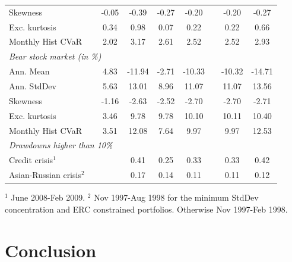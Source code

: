\documentclass[12pt,a4paper]{article}
\begin{document}
\begin{table}[tb]
\begin{center}
{\begin{tabular}{|lc c  cccc c cc| }
  \multicolumn{2}{|l}{Skewness }       &      &  -0.05 & -0.39 & -0.27 & -0.20 && -0.20 & -0.27   \\
    \multicolumn{2}{|l}{Exc. kurtosis }   &     & 0.34 & 0.98 & 0.07 & 0.22 & &0.22 & 0.66 \\
 \multicolumn{2}{|l}{Monthly Hist  CVaR}   &    &  2.02 & 3.17 & 2.61 & 2.52 & & 2.52 & 2.93 \\ \hline
 \multicolumn{10}{|l|}{\emph{Bear stock market (in \%)}} \\
 \multicolumn{2}{|l}{Ann. Mean  }    &       & 4.83 & -11.94 & -2.71 & -10.33 & & -10.32 & -14.71 \\
 \multicolumn{2}{|l}{Ann. StdDev}     &       & 5.63 & 13.01 & 8.96 & 11.07 & & 11.07 & 13.56       \\
  \multicolumn{2}{|l}{Skewness}     &         & -1.16 & -2.63 & -2.52 & -2.70 & & -2.70 & -2.71 \\
    \multicolumn{2}{|l}{Exc. kurtosis}   &     &3.46 & 9.78 & 9.78 & 10.10 & & 10.11 & 10.40     \\
 \multicolumn{2}{|l}{Monthly Hist  CVaR}   &	 & 3.51 & 12.08 & 7.64 & 9.97 & & 9.97 & 12.53 \\ \hline
\multicolumn{10}{|l|}{ \emph{Drawdowns higher than 10\%}  }  \\
 \multicolumn{2}{|l}{Credit crisis$^{1}$}       &   &   & 0.41 & 0.25 & 0.33 & &  0.33 & 0.42  \\
 \multicolumn{2}{|l}{Asian-Russian crisis$^{2}$}&  &   & 0.17 & 0.14 &0.11 & &  0.11 & 0.12 \\  \hline
\end{tabular}
}
\end{center}

{\scriptsize $^{1}$  June 2008-Feb 2009.  $^{2}$  Nov 1997-Aug 1998 for the minimum StdDev concentration and ERC constrained portfolios. Otherwise Nov 1997-Feb 1998.  }
\end{table}

\clearpage

\section{Conclusion \label{sec:Conclusion}}
\end{document}
